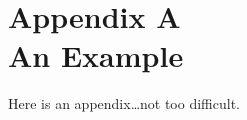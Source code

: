 \chapter[An Example Appendix]{Appendix A\\An Example}
\label{chap:AppA}
Here is an appendix\ldots not too difficult.